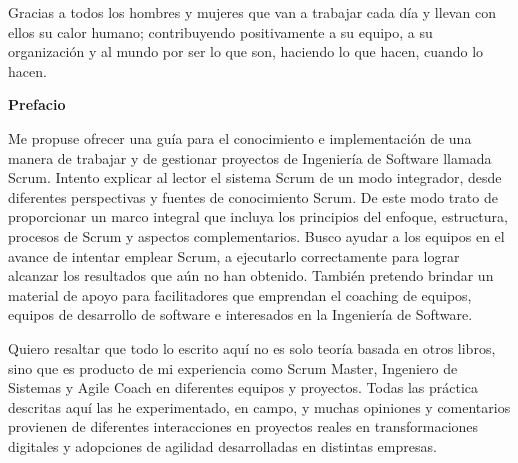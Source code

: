 
%

\newpage

\hspace{1cm}\newline %
\vspace{5cm} %

\begin{center}
Gracias a todos los hombres y mujeres que van a trabajar cada día y llevan con ellos su calor humano; contribuyendo positivamente a su equipo, a su organización y al mundo por ser lo que son, haciendo lo que hacen, cuando lo hacen.
\end{center}

\newpage
\vspace{2cm} %
\hspace{1cm}\newline %

%

\newpage

{\large \textbf{Prefacio}}

\vspace{2cm} %

Me propuse ofrecer una guía para el conocimiento e implementación de una manera de trabajar y de gestionar proyectos de Ingeniería de Software llamada Scrum. Intento explicar al lector el sistema Scrum de un modo integrador, desde diferentes perspectivas y fuentes de conocimiento Scrum. De este modo trato de proporcionar un marco integral que incluya los principios del enfoque, estructura, procesos de Scrum y aspectos complementarios. Busco ayudar a los equipos en el avance de intentar emplear Scrum, a ejecutarlo correctamente para lograr alcanzar los resultados que aún no han obtenido. También pretendo brindar un material de apoyo para facilitadores que emprendan el coaching de equipos, equipos de desarrollo de software e interesados en la Ingeniería de Software.

Quiero resaltar que todo lo escrito aquí no es solo teoría basada en otros libros, sino que es producto de mi experiencia como Scrum Master, Ingeniero de Sistemas y Agile Coach en diferentes equipos y proyectos. Todas las práctica descritas aquí las he experimentado, en campo, y muchas opiniones y comentarios provienen de diferentes interacciones en proyectos reales en transformaciones digitales y adopciones de agilidad desarrolladas en distintas empresas.

\newpage
\vspace{2cm} %
\hspace{1cm}\newline %
 
